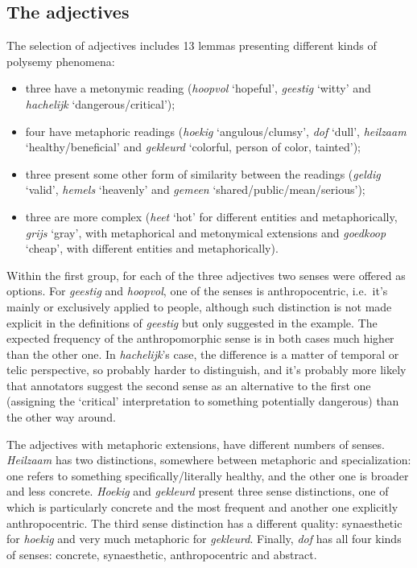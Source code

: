 \documentclass[
]{book}
\begin{document}
\hypertarget{adjs}{%
\subsection{The adjectives}\label{adjs}}

The selection of adjectives includes 13 lemmas presenting different kinds of polysemy phenomena:

\begin{itemize}
\item
  three have a metonymic reading (\emph{hoopvol} `hopeful', \emph{geestig} `witty' and \emph{hachelijk} `dangerous/critical');
\item
  four have metaphoric readings (\emph{hoekig} `angulous/clumsy', \emph{dof} `dull', \emph{heilzaam} `healthy/beneficial' and \emph{gekleurd} `colorful, person of color, tainted');
\item
  three present some other form of similarity between the readings (\emph{geldig} `valid', \emph{hemels} `heavenly' and \emph{gemeen} `shared/public/mean/serious');
\item
  three are more complex (\emph{heet} `hot' for different entities and metaphorically, \emph{grijs} `gray', with metaphorical and metonymical extensions and \emph{goedkoop} `cheap', with different entities and metaphorically).
\end{itemize}

Within the first group, for each of the three adjectives two senses were offered as options.
For \emph{geestig} and \emph{hoopvol}, one of the senses is anthropocentric, i.e.~it's mainly or exclusively applied to people, although such distinction is not made explicit in the definitions of \emph{geestig} but only suggested in the example. The expected frequency of the anthropomorphic sense is in both cases much higher than the other one.
In \emph{hachelijk}'s case, the difference is a matter of temporal or telic perspective, so probably harder to distinguish, and it's probably more likely that annotators suggest the second sense as an alternative to the first one (assigning the `critical' interpretation to something potentially dangerous) than the other way around.

The adjectives with metaphoric extensions, have different numbers of senses. \emph{Heilzaam} has two distinctions, somewhere between metaphoric and specialization: one refers to something specifically/literally healthy, and the other one is broader and less concrete.
\emph{Hoekig} and \emph{gekleurd} present three sense distinctions, one of which is particularly concrete and the most frequent and another one explicitly anthropocentric. The third sense distinction has a different quality: synaesthetic for \emph{hoekig} and very much metaphoric for \emph{gekleurd}.
Finally, \emph{dof} has all four kinds of senses: concrete, synaesthetic, anthropocentric and abstract.
\end{document}
